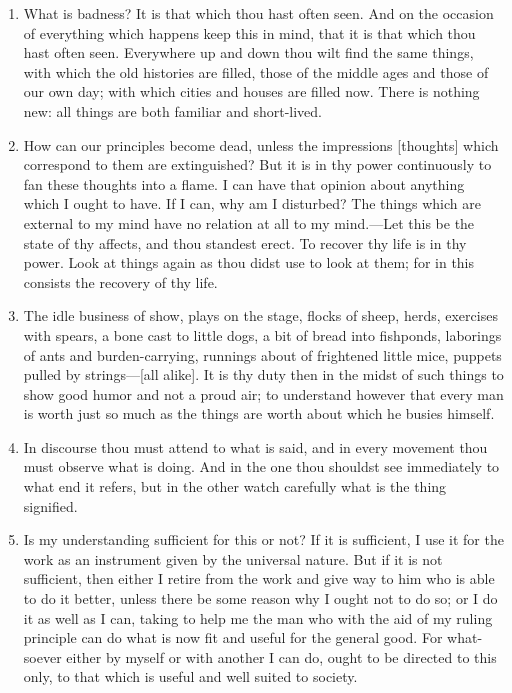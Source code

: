 \begin{enumerate}
\item What is badness? It is that which thou hast often seen. And on the occasion of everything which happens keep this in mind, that it is that which thou hast often seen. Everywhere up and down thou wilt find the same things, with which the old histories are filled, those of the middle ages and those of our own day; with which cities and houses are filled now. There is nothing new: all things are both familiar and short-lived.

\item How can our principles become dead, unless the impressions [{\clarify thoughts}] which correspond to them are extinguished? But it is in thy power continuously to fan these thoughts into a flame. I can have that opinion about anything which I ought to have. If I can, why am I disturbed? The things which are external to my mind have no relation at all to my mind.—Let this be the state of thy affects, and thou standest erect. To recover thy life is in thy power. Look at things again as thou didst use to look at them; for in this consists the recovery of thy life.

\item The idle business of show, plays on the stage, flocks of sheep, herds, exercises with spears, a bone cast to little dogs, a bit of bread into fishponds, laborings of ants and burden-carrying, runnings about of frightened little mice, puppets pulled by strings—[{\clarify all alike}]. It is thy duty then in the midst of such things to show good humor and not a proud air; to understand however that every man is worth just so much as the things are worth about which he busies himself.

\item In discourse thou must attend to what is said, and in every movement thou must observe what is doing. And in the one thou shouldst see immediately to what end it refers, but in the other watch carefully what is the thing signified.

\item Is my understanding sufficient for this or not? If it is sufficient, I use it for the work as an instrument given by the universal nature. But if it is not sufficient, then either I retire from the work and give way to him who is able to do it better, unless there be some reason why I ought not to do so; or I do it as well as I can, taking to help me the man who with the aid of my ruling principle can do what is now fit and useful for the general good. For what-soever either by myself or with another I can do, ought to be directed to this only, to that which is useful and well suited to society.


\end{enumerate}
